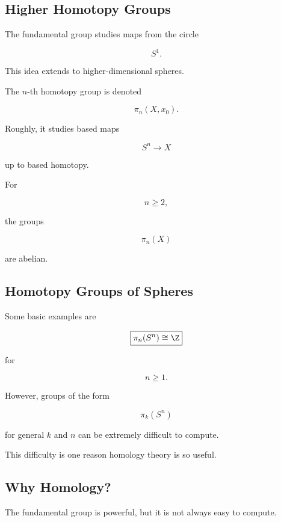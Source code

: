 \subsection{Higher Homotopy Groups}
\label{subsec:higher-homotopy-groups}

The fundamental group studies maps from the circle

\[
S^1.
\]

This idea extends to higher-dimensional spheres.

The \(n\)-th homotopy group is denoted

\[
\boxed{
\pi_n(X,x_0).
}
\]

Roughly, it studies based maps

\[
S^n\to X
\]

up to based homotopy.

For

\[
n\geq2,
\]

the groups

\[
\pi_n(X)
\]

are abelian.

\subsection{Homotopy Groups of Spheres}
\label{subsec:homotopy-groups-spheres}

Some basic examples are

\[
\boxed{
\pi_n(S^n)\cong\Z
}
\]

for

\[
n\geq1.
\]

However, groups of the form

\[
\pi_k(S^n)
\]

for general \(k\) and \(n\) can be extremely difficult to compute.

This difficulty is one reason homology theory is so useful.

\subsection{Why Homology?}
\label{subsec:why-homology}

The fundamental group is powerful, but it is not always easy to compute.

